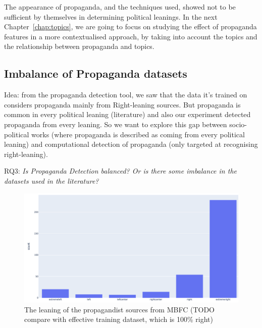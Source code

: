 The appearance of propaganda, and the techniques used, showed not to be sufficient by themselves in determining political leanings. In the next Chapter~\ref{chap:topics}, we are going to focus on studying the effect of propaganda features in a more contextualised approach, by taking into account the topics and the relationship between propaganda and topics.








\subsection{\statusorange Imbalance of Propaganda datasets}
\label{ssec:ps_prop_leaning_unbalanced}



Idea: from the propaganda detection tool, we saw that the data it’s trained on considers propaganda mainly from Right-leaning sources. But propaganda is common in every political leaning (literature) and also our experiment detected propaganda from every leaning. So we want to explore this gap between socio-political works (where propaganda is described as coming from every political leaning) and computational detection of propaganda (only targeted at recognising right-leaning).



RQ3: \emph{Is Propaganda Detection balanced? Or is there some imbalance in the datasets used in the literature?}

\begin{figure}[!htb]
   \centering
   \includegraphics[width=\linewidth]{figures/leaning_questionable.png}
   \caption{The leaning of the propagandist sources from MBFC (TODO compare with effective training dataset, which is 100\% right)}
   \label{fig:mbfc_leaning}
\end{figure}

